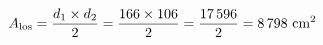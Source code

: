 \documentclass[preview]{standalone}
\begin{document}
\begin{align*}
\special{dvisvgm:raw <g id='unique000'>}A_{\text{los}} = \frac{d_1 \times d_2}{2}= \frac{166 \times 106}{2} = \frac{17\,596}{2} = 8\,798 \text{ cm}^2\special{dvisvgm:raw </g>}
\end{align*}
\end{document}
